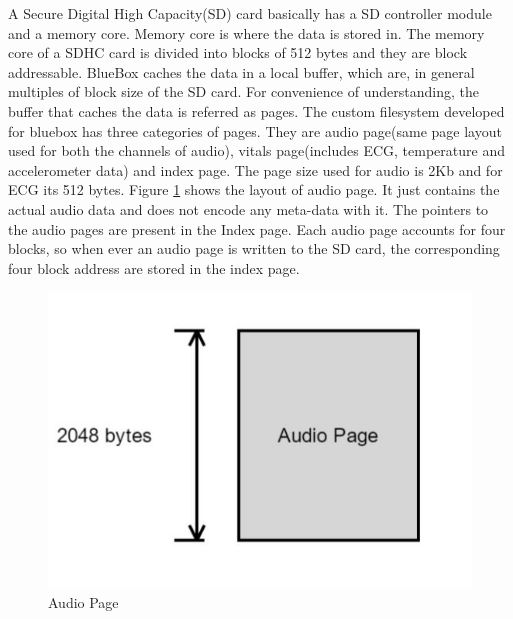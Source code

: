 A Secure Digital High Capacity(SD) card basically has a SD controller module and a memory core. Memory core is where the data is stored in. The memory core of a SDHC card is divided into blocks of 512 bytes and they are block addressable. BlueBox caches the data in a local buffer, which are, in general multiples of block size of the SD card. For convenience of understanding, the buffer that caches the data is referred as pages. The custom filesystem developed for bluebox has three categories of pages. They are audio page(same page layout used for both the channels of audio), vitals page(includes ECG, temperature and accelerometer data) and index page. The page size used for audio is 2Kb and for ECG its 512 bytes.
 Figure \ref{audio_page} shows the layout of audio page. It just contains the actual audio data and does not encode any meta-data with it. The pointers to the audio pages are present in the Index page. Each audio page accounts for four blocks, so when ever an audio page is written to the SD card, the corresponding four block address are stored in the index page. 
\begin{figure}[h]
	\centering
	\hspace*{-2cm} 
	\includegraphics[scale = 0.5 ]{audio_page.JPG}
	\caption{Audio Page\label{audio_page}}
\end{figure}

